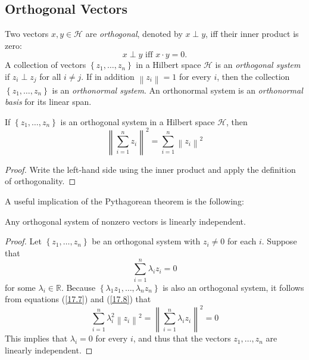 \documentclass[\topdir/lecture\_notes.tex]{subfiles}
\begin{document}
\subsection{Orthogonal Vectors}
Two vectors $x, y \in \mathcal{H}$ are \emph{orthogonal}, denoted by $x \perp y$, iff their inner product is zero:
\begin{equation*}
x \perp y \text { iff } x \cdot y=0. 
\end{equation*}
A collection of vectors $\left\{z_{1}, \ldots, z_{n}\right\}$ in a Hilbert space $\mathcal{H}$ is an \emph{orthogonal system} if $z_{i} \perp z_{j}$ for all $i \neq j$. If in addition $\left\|z_{i}\right\|=1$ for every $i$, then the collection $\left\{z_{1}, \ldots, z_{n}\right\}$ is an \emph{orthonormal system}. An orthonormal system is an \emph{orthonormal basis} for its linear span.
\begin{theorem}\label{thm:pythagorean}
If $\left\{z_{1}, \ldots, z_{n}\right\}$ is an orthogonal system in a Hilbert space $\mathcal{H}$, then
\begin{equation}
\left\|\sum_{i=1}^{n} z_{i}\right\|^{2}=\sum_{i=1}^{n}\left\|z_{i}\right\|^{2} \label{17.7}
\end{equation}
\end{theorem}
\begin{proof}
Write the left-hand side using the inner product and apply the definition of orthogonality.
\end{proof}
A useful implication of the Pythagorean theorem is the following:
\begin{theorem}\label{thm:orthogonal_independence}
Any orthogonal system of nonzero vectors is linearly independent.
\end{theorem}
\begin{proof}
Let $\left\{z_{1}, \ldots, z_{n}\right\}$ be an orthogonal system with $z_{i} \neq 0$ for each $i$. Suppose that
\begin{equation}
\sum_{i=1}^{n} \lambda_{i} z_{i}=0 \label{17.8}
\end{equation}
for some $\lambda_{i} \in \mathbb{R}$. Because $\left\{\lambda_{1} z_{1}, \ldots, \lambda_{n} z_{n}\right\}$ is also an orthogonal system, it follows from equations (\ref{17.7}) and (\ref{17.8}) that
\begin{equation*}
\sum_{i=1}^{n} \lambda_{i}^{2}\left\|z_{i}\right\|^{2}=\left\|\sum_{i=1}^{n} \lambda_{i} z_{i}\right\|^{2}=0 
\end{equation*}
This implies that $\lambda_{i}=0$ for every $i$, and thus that the vectors $z_{1}, \ldots, z_{n}$ are linearly independent.
\end{proof}
\end{document}

